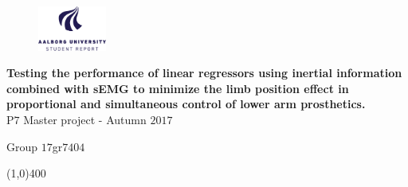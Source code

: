 \clearpage
\thispagestyle{empty}

\begin{figure}[H]
	\raggedleft
	\includegraphics[width=0.2\textwidth]{figures/aaulogo-en.png}
\end{figure} 

\vspace{5 cm}

\begin{center}
	\begin{Huge}
		\textbf{Testing the performance of linear regressors using inertial information combined with sEMG to minimize the limb position effect in proportional and simultaneous control of lower arm prosthetics.}\\
		\vspace{5 mm}
		P$7$ Master project - Autumn $2017$\\
		\vspace{3 mm}
	\end{Huge}
	{\Large Group $17$gr$7404$}
\end{center}
\vspace*{\fill}

\begin{center}
	\line(1,0){400}
\end{center}

